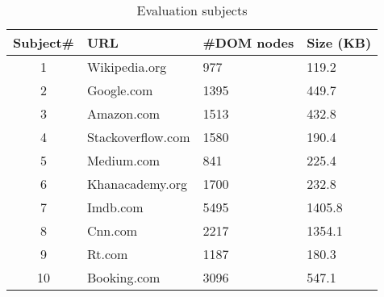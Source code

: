 \begin{table}[b]
	\caption{Evaluation subjects}
	\centering
	\begin{threeparttable}
		\bgroup
		\begin{tabular}{c l l l}
			\toprule
			\textbf{Subject\#} & \textbf{URL}	& \textbf{\#DOM nodes}  &  \textbf{Size (KB)} \\
			\toprule
1 	 & 	 Wikipedia.org 	    & 	 977	 & 	 119.2 	    \\
2 	 & 	 Google.com 	    & 	 1395 	 & 	 449.7 	\\
3 	 & 	 Amazon.com 	    & 	 1513 	 & 	 432.8 	    \\
4 	 & 	 Stackoverflow.com 	& 	 1580 	 & 	 190.4 	\\
5 	 & 	 Medium.com 	    & 	 841 	 & 	 225.4 	\\
6 	 & 	 Khanacademy.org 	& 	 1700 	 & 	 232.8 	\\
7 	 & 	 Imdb.com 	        & 	 5495 	 & 	 1405.8 	\\
8 	 & 	 Cnn.com 	        & 	 2217 	 & 	 1354.1 	 \\
9 	 & 	 Rt.com 	        & 	 1187 	 & 	 180.3 	 \\
10 	 & 	 Booking.com 	    & 	 3096 	 & 	 547.1 	 \\


\bottomrule

\end{tabular}
\egroup
\end{threeparttable}
\label{tbl:subjects}
\end{table}